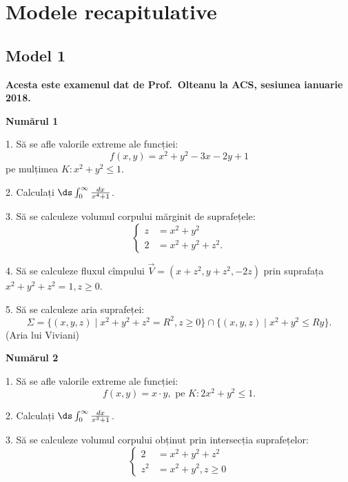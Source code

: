 \chapter{Modele recapitulative}

\section{Model 1}

\textbf{Acesta este examenul dat de Prof.\ Olteanu la ACS, sesiunea ianuarie 2018.}

\textbf{Numărul 1}

1. Să se afle valorile extreme ale funcției:
\[
  f(x,y) = x^2 + y^2 - 3x - 2y + 1
\]
pe mulțimea $K: x^2 + y^2 \leq 1$.

\vspace{1cm}

2. Calculați $\ds\int_0^\infty \frac{dx}{x^4 + 1}$.

\vspace{1cm}

3. Să se calculeze volumul corpului mărginit de suprafețele:
\[
  \begin{cases}
    z &= x^2 + y^2 \\
    2 &= x^2 + y^2 + z^2.
  \end{cases}
\]

\vspace{1cm}

4. Să se calculeze fluxul cîmpului $\vec{V} = (x + z^2, y + z^2, -2z)$
prin suprafața $x^2 + y^2 + z^2 = 1, z \geq 0$.

\vspace{1cm}

5. Să se calculeze aria suprafeței:
\[
  \Sigma = \{ (x, y, z) \mid x^2 + y^2 + z^2 = R^2, z \geq 0 \} \cap %
  \{ (x, y, z) \mid x^2 + y^2 \leq Ry \}.
\]
(Aria lui Viviani)

\vspace{1cm}

\textbf{Numărul 2}

1. Să se afle valorile extreme ale funcției:
\[
  f(x, y) = x \cdot y, \text{ pe } K: 2x^2 + y^2 \leq 1.
\]

\vspace{1cm}

2. Calculați $\ds\int_0^\infty \frac{dx}{x^3 + 1}$.

\vspace{1cm}

3. Să se calculeze volumul corpului obținut prin intersecția suprafețelor:
\[
  \begin{cases}
    2 &= x^2 + y^2 + z^2 \\
    z^2 &= x^2 + y^2, z \geq 0
  \end{cases}
\]

